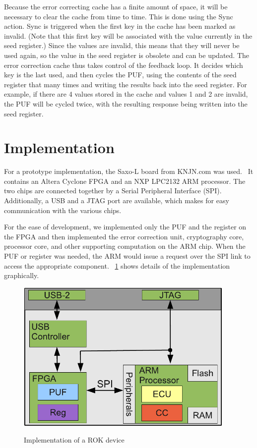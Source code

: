 Because the error correcting cache has a finite amount of space, it will be necessary to clear the cache from time to
time. This is done using the Sync action. Sync is triggered when the first key in the cache has been marked as invalid.
(Note that this first key will be associated with the value currently in the seed register.) Since the values are invalid,
this means that they will never be used again, so the value in the seed register is obsolete and can be updated.
The error correction cache thus takes control of the feedback loop. It decides which key is the last used, and then cycles
the PUF, using the contents of the seed register that many times and writing the results back into the seed register.
For example, if there are 4 values stored in the cache and values 1 and 2 are invalid, the PUF will be cycled twice,
with the resulting response being written into the seed register.

\section{Implementation}
For a prototype implementation, the Saxo-L board from KNJN.com was used.~\cite{KNJN} It contains an Altera
Cyclone FPGA and an NXP LPC2132 ARM processor. The two chips are connected together by a Serial Peripheral
Interface (SPI). Additionally, a USB and a JTAG port are available, which makes for easy communication with the
various chips.

For the ease of development, we implemented only the PUF and the register on the FPGA and then implemented
the error correction unit, cryptography core, processor core, and other supporting computation on the ARM chip. 
When the PUF or register was needed, the ARM would issue a request over the SPI link to access the appropriate component.
~\ref{fig:rokimpl} shows details of the implementation graphically.

\begin{figure}[!ht]
\includegraphics[width=400px]{images/rok.pdf}
\label{fig:rokimpl}
\caption{Implementation of a ROK device}
\end{figure}
\FloatBarrier

